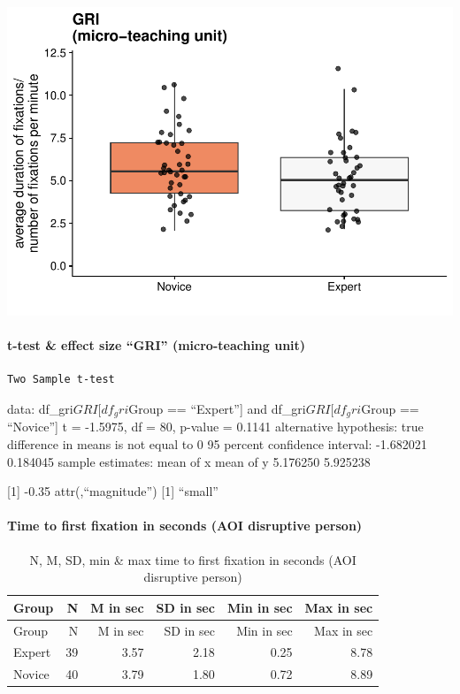 \documentclass[
]{article}
\begin{document}
\includegraphics{expertise_2024_09_26_no_outlierdetection_MK_files/figure-latex/gri_all-1.pdf}

\paragraph{t-test \& effect size ``GRI'' (micro-teaching
unit)}\label{t-test-effect-size-gri-micro-teaching-unit}

\begin{verbatim}
Two Sample t-test
\end{verbatim}

data: df\_gri\(GRI[df_gri\)Group == ``Expert''{]} and
df\_gri\(GRI[df_gri\)Group == ``Novice''{]} t = -1.5975, df = 80,
p-value = 0.1141 alternative hypothesis: true difference in means is not
equal to 0 95 percent confidence interval: -1.682021 0.184045 sample
estimates: mean of x mean of y 5.176250 5.925238

{[}1{]} -0.35 attr(,``magnitude'') {[}1{]} ``small''

\paragraph{Time to first fixation in seconds (AOI disruptive
person)}\label{time-to-first-fixation-in-seconds-aoi-disruptive-person}

\begin{longtable}[]{@{}lrrrrr@{}}
\caption{N, M, SD, min \& max time to first fixation in seconds (AOI
disruptive person)}\tabularnewline
\toprule\noalign{}
Group & N & M in sec & SD in sec & Min in sec & Max in sec \\
\midrule\noalign{}
\endfirsthead
\toprule\noalign{}
Group & N & M in sec & SD in sec & Min in sec & Max in sec \\
\midrule\noalign{}
\endhead
\bottomrule\noalign{}
\endlastfoot
Expert & 39 & 3.57 & 2.18 & 0.25 & 8.78 \\
Novice & 40 & 3.79 & 1.80 & 0.72 & 8.89 \\
\end{longtable}
\end{document}
